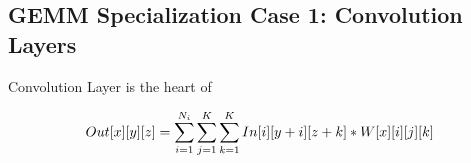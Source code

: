 \documentclass{acm_proc_article-sp-copy}
\begin{document}
\subsection{GEMM Specialization Case 1: Convolution Layers}
Convolution Layer is the heart of 

\begin{equation}
\centering
Out[x][y][z]=\sum_{i=1}^{N_i}\sum_{j=1}^{K}\sum_{k=1}^{K}In[i][y+i][z+k]*W[x][i][j][k]
\label{conv}
\end{equation}

\end{document}
